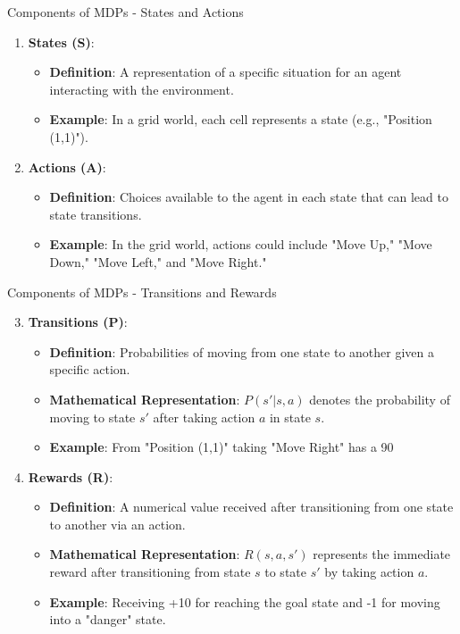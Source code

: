 \documentclass[aspectratio=169]{beamer}
\begin{document}
\begin{frame}[fragile]{Components of MDPs - States and Actions}
    \begin{enumerate}
        \item \textbf{States (S)}:
        \begin{itemize}
            \item \textbf{Definition}: A representation of a specific situation for an agent interacting with the environment.
            \item \textbf{Example}: In a grid world, each cell represents a state (e.g., "Position (1,1)").
        \end{itemize}
        
        \item \textbf{Actions (A)}:
        \begin{itemize}
            \item \textbf{Definition}: Choices available to the agent in each state that can lead to state transitions.
            \item \textbf{Example}: In the grid world, actions could include "Move Up," "Move Down," "Move Left," and "Move Right."
        \end{itemize}
    \end{enumerate}
\end{frame}

\begin{frame}[fragile]{Components of MDPs - Transitions and Rewards}
    \begin{enumerate}
        \setcounter{enumi}{2}
        \item \textbf{Transitions (P)}:
        \begin{itemize}
            \item \textbf{Definition}: Probabilities of moving from one state to another given a specific action.
            \item \textbf{Mathematical Representation}: $P(s' | s, a)$ denotes the probability of moving to state $s'$ after taking action $a$ in state $s$.
            \item \textbf{Example}: From "Position (1,1)" taking "Move Right" has a 90%
        \end{itemize}

        \item \textbf{Rewards (R)}:
        \begin{itemize}
            \item \textbf{Definition}: A numerical value received after transitioning from one state to another via an action.
            \item \textbf{Mathematical Representation}: $R(s, a, s')$ represents the immediate reward after transitioning from state $s$ to state $s'$ by taking action $a$.
            \item \textbf{Example}: Receiving +10 for reaching the goal state and -1 for moving into a "danger" state.
        \end{itemize}
    \end{enumerate}
\end{frame}
\end{document}
